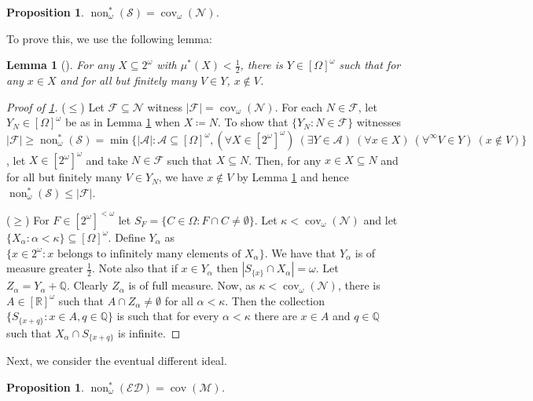\documentclass[a4paper,12pt]{amsart}
\newtheorem{prop}[thm]{Proposition}
\newtheorem{lem}[thm]{Lemma}
\theoremstyle{definition}
\numberwithin{thm}{section}
\numberwithin{equation}{section}
\renewcommand{\a}{\alpha}
\DeclareMathOperator{\non}{non}
\DeclareMathOperator{\cov}{cov}
\newcommand{\covm}{\cov(\mathcal{M})}
\newcommand{\ed}{\mathcal{ED}}
\newcommand{\covomn}{\operatorname{cov}_\omega(\mathcal{N})}
\begin{document}
    \begin{prop}\label{prop:Solecki_non_omega}
	   $\non^*_\omega(\mathcal{S}) = \covomn$.
    \end{prop}

    To prove this, we use the following lemma:

    \begin{lem}[{\cite[Lemma 5.5]{HMM10}}] \label{lem:outer_half} 
        For any $X\subseteq 2^\omega$ with $\mu^*(X)<\frac{1}{2}$, there is $Y\in[\Omega]^\omega$ such that for any $x\in X$ and for all but finitely many $V\in Y$,  $x\notin V$.
    \end{lem}
    
    \begin{proof}[Proof of \cref{prop:Solecki_non_omega}]
    	($\leq$) Let $\mathcal{F}\subseteq\mathcal{N}$ witness $|\mathcal{F}|=\covomn$. For each $N\in\mathcal{F}$, let $Y_N\in[\Omega]^\omega$ be as in Lemma \ref{lem:outer_half} when $X\coloneqq N$. To show that $\{Y_N:N\in\mathcal{F}\}$ witnesses $|\mathcal{F}|\geq\non^*_\omega(\mathcal{S})=\min\{|\mathcal{A}|:\mathcal{A}\subseteq[\Omega]^\omega, (\forall X\in[2^\omega]^\omega)~(\exists Y\in\mathcal{A})~(\forall x\in X)~(\forall^\infty V\in Y)~(x\notin V) \}$, let $X\in[2^\omega]^\omega$ and take $N\in\mathcal{F}$ such that $X\subseteq N$. Then, for any $x\in X\subseteq N$ and for all but finitely many $V\in Y_N$,  we have $x\notin V$ by Lemma \ref{lem:outer_half} and hence $\non^*_\omega(\mathcal{S})\leq|\mathcal{F}|$.
        
    	($\geq$) For $F\in[2^\omega]^{<\omega}$ let $S_F=\{C\in\Omega:F\cap C\neq \emptyset\}$. Let $\kappa<\covomn$ and let $\{X_\a:\a<\kappa\}\subseteq[\Omega]^\omega$. Define $Y_\a$ as $\{x\in2^\omega:x\text{ belongs to infinitely many elements of }X_\a\}$. We have that $Y_\a$ is of measure greater $\frac{1}{2}$. Note also that if $x\in Y_\a$ then $|S_{\{x\}}\cap X_\a|=\omega$. Let $Z_\a = Y_\a + \mathbb{Q}$. Clearly $Z_\a$ is of full measure. Now, as $\kappa <\covomn$, there is $A\in[\mathbb{R}]^\omega$ such that $A\cap Z_\a\neq\emptyset$ for all $\a<\kappa$. Then the collection $\{S_{\{x+q\}} : x\in A, q \in\mathbb{Q}\}$ is such that for every $\a < \kappa$ there are $x\in A$ and $q\in \mathbb{Q}$ such that $X_\a \cap S_{\{x+q\}}$ is infinite.
    \end{proof}

    Next, we consider the eventual different ideal.

    \begin{prop}\label{prop:non_star_omega_ed}
    	$\non^*_\omega(\ed)=\covm$.
    \end{prop}
\end{document}
